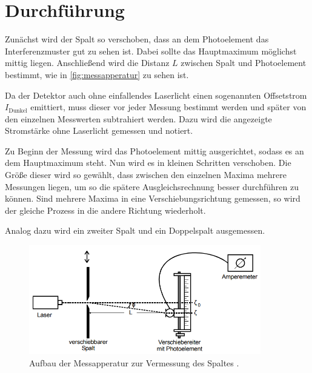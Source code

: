 \section{Durchführung}
\label{sec:Durchführung}

Zunächst wird der Spalt so verschoben, dass an dem Photoelement das Interferenzmuster gut zu sehen ist.
Dabei sollte das Hauptmaximum möglichst mittig liegen.
Anschließend wird die Distanz $L$ zwischen Spalt und Photoelement bestimmt, wie in \autoref{fig:messapperatur} zu sehen ist.

Da der Detektor auch ohne einfallendes Laserlicht einen sogenannten Offsetstrom $I_\text{Dunkel}$ emittiert, muss dieser vor jeder Messung bestimmt werden und später von den einzelnen Messwerten subtrahiert werden.
Dazu wird die angezeigte Stromstärke ohne Laserlicht gemessen und notiert.

Zu Beginn der Messung wird das Photoelement mittig ausgerichtet, sodass es an dem Hauptmaximum steht.
Nun wird es in kleinen Schritten verschoben. Die Größe dieser wird so gewählt, dass zwischen den einzelnen Maxima mehrere Messungen liegen, um so die spätere Ausgleichsrechnung besser durchführen zu können.
Sind mehrere Maxima in eine Verschiebungsrichtung gemessen, so wird der gleiche Prozess in die andere Richtung wiederholt.

Analog dazu wird ein zweiter Spalt und ein Doppelspalt ausgemessen.


\begin{figure}
    \centering
    \includegraphics[width=0.9\textwidth]{content/messapperatur.png}
    \caption{Aufbau der Messapperatur zur Vermessung des Spaltes \cite{V406}.}
    \label{fig:messapperatur}
\end{figure}
